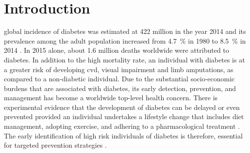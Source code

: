 \documentclass[journal,comsoc]{IEEEtran}
\renewcommand{\^}{\hat}  %
\begin{document}
\section{Introduction}
%
%
%
%
 global incidence of diabetes was estimated at \num{422} million in the year \num{2014} and its prevalence among the adult population increased from \SI{4.7}{\percent} in \num{1980} to \SI{8.5}{\percent} in \num{2014} \cite{mathers_projections_2006}. In \num{2015} alone, about \num{1.6} million deaths worldwide were attributed to diabetes. In addition to the high mortality rate, an individual with diabetes is at a greater risk of developing \ac{cvd}, visual impairment and limb amputations, as compared to a non-diabetic individual. Due to the substantial socio-economic burdens that are associated with diabetes, its early detection, prevention, and management has become a worldwide top-level health concern. There is experimental evidence that the development of diabetes can be delayed or even prevented provided an individual undertakes a lifestyle change that includes diet management, adopting exercise, and adhering to a pharmacological treatment \cite{tuomilehto2001prevention}. The early identification of high risk individuals of diabetes is therefore, essential for targeted prevention strategies \cite{diabetes2015long}.
\end{document}
